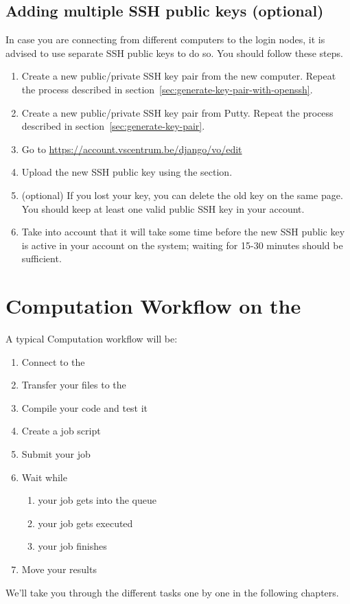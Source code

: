 \subsection{Adding multiple SSH public keys (optional)}
\label{sec:adding-multiple-keys}
In case you are connecting from different computers to the login nodes, it is advised to use separate SSH public keys to do so.
You should follow these steps.

\begin{enumerate}
\ifmacORlinux
 \item Create a new public/private SSH key pair from the new computer. Repeat the process described in section~\ref{sec:generate-key-pair-with-openssh}.
\fi %
\ifwindows
 \item Create a new public/private SSH key pair from Putty. Repeat the process described in section~\ref{sec:generate-key-pair}.
\fi %
 \item Go to \url{https://account.vscentrum.be/django/vo/edit}
 \item Upload the new SSH public key using the  section.
 \item (optional) If you lost your key, you can delete the old key on the same page. You should keep at least one valid public SSH key in your account.
 \item Take into account that it will take some time before the new SSH public key is active in your account on the system; waiting for 15-30 minutes should be sufficient.
\end{enumerate}

\section{Computation Workflow on the \hpc}
\label{sec:compuation-workflow-on-the-hpc}

A typical Computation workflow will be:

\begin{enumerate}
  \item  Connect to the \hpc
  \item  Transfer your files to the \hpc
  \item  Compile your code and test it
  \item  Create a job script
  \item  Submit your job
  \item  Wait while
  \begin{enumerate}
    \item  your job gets into the queue
    \item  your job gets executed
    \item  your job finishes
  \end{enumerate}
  \item  Move your results
\end{enumerate}

We'll take you through the different tasks one by one in the following
chapters.

